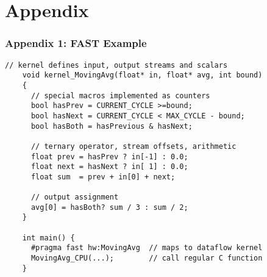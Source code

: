 \section{Appendix}

\begin{frame}[fragile]
  \frametitle{Appendix 1: FAST Example}

  \begin{lstlisting}[style=MaxC,   basicstyle=\scriptsize]
    // kernel defines input, output streams and scalars
    void kernel_MovingAvg(float* in, float* avg, int bound)
    {
      // special macros implemented as counters
      bool hasPrev = CURRENT_CYCLE >=bound;
      bool hasNext = CURRENT_CYCLE < MAX_CYCLE - bound;
      bool hasBoth = hasPrevious & hasNext;

      // ternary operator, stream offsets, arithmetic
      float prev = hasPrev ? in[-1] : 0.0;
      float next = hasNext ? in[ 1] : 0.0;
      float sum  = prev + in[0] + next;

      // output assignment
      avg[0] = hasBoth? sum / 3 : sum / 2;
    }

    int main() {
      #pragma fast hw:MovingAvg  // maps to dataflow kernel
      MovingAvg_CPU(...);        // call regular C function
    }
  \end{lstlisting}
\end{frame}

